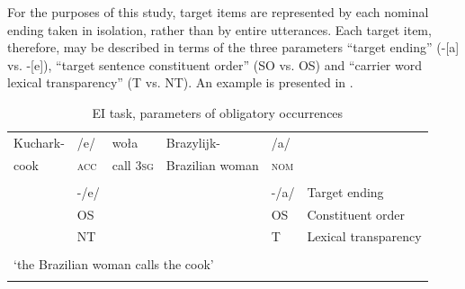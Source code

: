 \begin{table}
    \caption{EI task, target sentences}
    \label{tab:02:11}
\end{table}

\largerpage

For the purposes of this study, target items are represented by each nominal ending taken in isolation, rather than by entire utterances. Each target item, therefore, may be described in terms of the three parameters “target ending” (-[a] vs. -[e]), “target sentence constituent order” (SO vs. OS) and “carrier word lexical transparency” (T vs. NT). An example is presented in .

\begin{table}[b]
    \begin{tabularx}{\textwidth}{llllll}
    \lsptoprule
         {Kuchark-} & {/e/} & {woła} &  {Brazylijk-} & {/a/} & \\
          cook & \textsc{acc} & call \textsc{3sg} &  Brazilian woman & \textsc{nom} & \\
        &  &  &  &  & \\
        & {}-/e/ &  &  & {}-/a/ & Target ending\\
        & OS &  &  & OS & Constituent order\\
        & NT &  &  & T & Lexical transparency\\
        \multicolumn{5}{c}{} & \\
        \multicolumn{5}{l}{‘the Brazilian woman calls the cook’} & \\
    \lspbottomrule
    \end{tabularx}
    \caption{EI task, parameters of obligatory occurrences}
    \label{tab:02:12}
\end{table}


